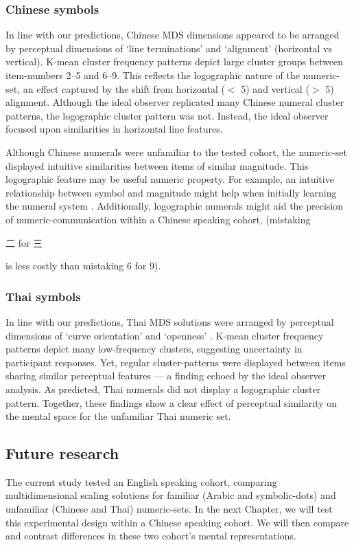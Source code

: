 \subsubsection{Chinese symbols}
In line with our predictions, Chinese MDS dimensions appeared to be arranged by perceptual dimensions of `line terminations’ \cite<as similarly found in letters,>{fiset2008features} and `alignment’ (horizontal vs vertical). K-mean cluster frequency patterns depict large cluster groups between item-numbers 2--5 and 6--9. This reflects the logographic nature of the numeric-set, an effect captured by the shift from horizontal ($<$ 5) and vertical ($>$ 5) alignment. Although the ideal observer replicated many Chinese numeral cluster patterns, the logographic cluster pattern was not. Instead, the ideal observer focused upon similarities in horizontal line features. 

Although Chinese numerals were unfamiliar to the tested cohort, the numeric-set displayed intuitive similarities between items of similar magnitude. This logographic feature may be useful numeric property. For example, an intuitive relationship between symbol and magnitude might help when initially learning the numeral system \cite{hung1992automatic}. Additionally, logographic numerals might aid the precision of numeric-communication within a Chinese speaking cohort, (\eg mistaking \begin{CJK}{UTF8}{gbsn}二 for 三\end{CJK} is less costly than mistaking 6 for 9).

\subsubsection{Thai symbols}
In line with our predictions, Thai MDS solutions were arranged by perceptual dimensions of `curve orientation' and `openness' \cite<as found in Arabic numerals,>{godwin2014numSim}. K-mean cluster frequency patterns depict many low-frequency clusters, suggesting uncertainty in participant responses. Yet, regular cluster-patterns were displayed between items sharing similar perceptual features --- a finding echoed by the ideal observer analysis. As predicted, Thai numerals did not display a logographic cluster pattern. Together, these findings show a clear effect of perceptual similarity on the mental space for the unfamiliar Thai numeric set. 

\subsection{Future research}
The current study tested an English speaking cohort, comparing multidimensional scaling solutions for familiar (Arabic and symbolic-dots) and unfamiliar (Chinese and Thai) numeric-sets. In the next Chapter, we will test this experimental design within a Chinese speaking cohort. We will then compare and contrast differences in these two cohort's mental representations. %

